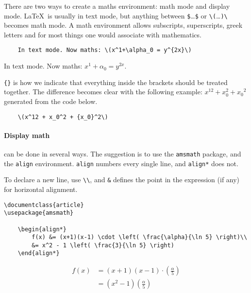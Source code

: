 There are two ways to create a maths environment: math mode and display mode.
\LaTeX\ is usually in text mode, but anything between \verb|$|\dots\verb|$| or \verb|\(|\dots \verb|)\| becomes math mode\footnotemark.
A math environment allows subscripts, superscripts, greek letters and for most things one would associate with mathematics.
\begin{lstlisting}
    In text mode. Now maths: \(x^1+\alpha_0 = y^{2x}\)
\end{lstlisting}

In text mode. Now maths: \(x^1+\alpha_0 = y^{2x}\).

\verb|{}| is how we indicate that everything inside the brackets should be treated together.
The difference becomes clear with the following example: \(x^12 + x_0^2 + {x_0}^2\) generated from the code below. %
\begin{lstlisting}
    \(x^12 + x_0^2 + {x_0}^2\)
\end{lstlisting}

\paragraph{Display math} can be done in several ways.
The suggestion is to use the \verb|amsmath| package, and the \verb|align| environment.
\texttt{align} numbers every single line, and \texttt{align*} does not.

To declare a new line, use \verb|\\|, and \verb|&| defines the point in the expression (if any) for horizontal alignment.
\begin{lstlisting}
\documentclass{article}
\usepackage{amsmath}

    \begin{align*}
        f(x) &= (x+1)(x-1) \cdot \left( \frac{\alpha}{\ln 5} \right)\\
        &= x^2 - 1 \left( \frac{3}{\ln 5} \right)
    \end{align*}

\end{lstlisting}
\begin{align*}
    f(x) &= (x+1)(x-1) \cdot \left( \frac{\alpha}{5} \right)\\
    &= (x^2 - 1)  (\frac{\alpha}{5} )
\end{align*}

